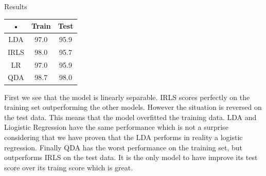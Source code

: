 \documentclass[a4paper]{article}
\begin{document}
\begin{minipage}[c]{0,35\textwidth}
Results\\
\begin{tabular}{|c|c|c|}
\hline 
• & Train & Test \\ 
\hline 
LDA & 97.0 & 95.9 \\ 
\hline 
IRLS & 98.0 & 95.7 \\ 
\hline 
LR & 97.0 & 95.9 \\ 
\hline 
QDA & 98.7 & 98.0 \\ 
\hline 
\end{tabular} 
\end{minipage}
\begin{minipage}{0,6\textwidth}
First we see that the model is linearly separable. IRLS scores perfectly on the training set outperforming the other models. However the situation is reversed on the test data. This means that the model overfitted the training data. LDA and Liogistic Regression have the same performance which is not a surprise considering that we have proven that the LDA performs in reality a logistic regression. Finally QDA has the worst performance on the training set, but outperforms IRLS on the test data. It is the only model to have improve its test score over its traing score which is great.
\end{minipage}
\newpage
\end{document}
